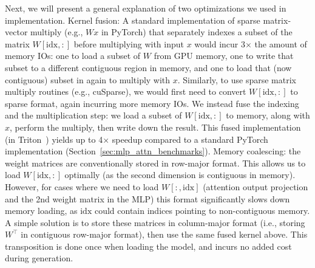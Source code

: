 Next, we will present a general explanation of two optimizations we used in \name{} implementation. Kernel fusion: A standard implementation of sparse matrix-vector
  multiply (e.g., $Wx$ in PyTorch) that separately indexes a subset of the matrix
  $W[\mathrm{idx}, :]$ before multiplying with input $x$ would incur 3$\times$ the
  amount of memory IOs: one to load a subset of $W$ from GPU memory, one to
  write that subset to a different contiguous region in memory, and one to load
  that (now contiguous) subset in again to multiply with $x$.
  Similarly, to use sparse matrix multiply routines (e.g., cuSparse), we would
  first need to convert $W[\mathrm{idx}, :]$ to sparse format, again incurring
  more memory IOs.
  We instead fuse the indexing and the multiplication step: we load a subset of
  $W[\mathrm{idx}, :]$ to memory, along with $x$, perform the multiply, then
  write down the result.
  This fused implementation (in Triton~\citep{tillet2019triton}) yields up to
  4$\times$ speedup compared to a standard PyTorch implementation (Section~\ref{sec:mlp_attn_benchmarks}). Memory coalescing: the weight matrices are conventionally stored in
  row-major format.
  This allows us to load $W[\mathrm{idx}, :]$ optimally (as the second dimension
  is contiguous in memory).
  However, for cases where we need to load $W[:, \mathrm{idx}]$ (attention
  output projection and the 2nd weight matrix in the MLP) this format
  significantly slows down memory loading, as $\mathrm{idx}$ could contain
  indices pointing to non-contiguous memory.
  A simple solution is to store these matrices in column-major format (i.e.,
  storing $W^\top$ in contiguous row-major format), then use the same fused kernel
  above.
  This transposition is done once when loading the model, and incurs no added
  cost during generation.